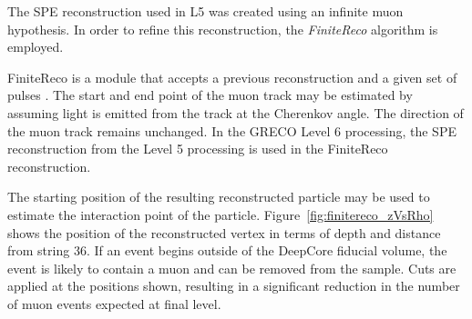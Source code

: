 The SPE reconstruction used in L5 was created using an infinite muon hypothesis. 
In order to refine this reconstruction, the \emph{FiniteReco} algorithm is employed.

FiniteReco is a module that accepts a previous reconstruction and a given set of pulses \cite{Thesis-Euler}.
The start and end point of the muon track may be estimated by assuming light is emitted from the track at the Cherenkov angle.
The direction of the muon track remains unchanged.
In the GRECO Level 6 processing, the SPE reconstruction from the Level 5 processing is used in the FiniteReco reconstruction.

The starting position of the resulting reconstructed particle may be used to estimate the interaction point of the particle.
Figure~\ref{fig:finitereco_zVsRho} shows the position of the reconstructed vertex in terms of depth and distance from string 36.
If an event begins outside of the DeepCore fiducial volume, the event is likely to contain a muon and can be removed from the sample.
Cuts are applied at the positions shown, resulting in a significant reduction in the number of muon events expected at final level.

